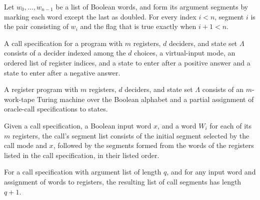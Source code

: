 \begin{lemma}
\label{Complexity.LogProg.seg_argSegs}
\leanok
{}
Let $w_0,\ldots,w_{n-1}$ be a list of Boolean words, and form its argument segments by
marking each word except the last as doubled. For every index $i<n$, segment $i$ is the
pair consisting of $w_i$ and the flag that is true exactly when $i+1<n$.
\end{lemma}

\begin{definition}
\label{Complexity.LogProg.CallSpec}
\leanok
{}
A call specification for a program with $m$ registers, $d$ deciders, and state set
$\Lambda$ consists of a decider indexed among the $d$ choices, a virtual-input mode, an
ordered list of register indices, and a state to enter after a positive answer and a
state to enter after a negative answer.
\end{definition}

\begin{definition}
\label{Complexity.LogProg.RProg}
\leanok
{}
A register program with $m$ registers, $d$ deciders, and state set $\Lambda$ consists of
an $m$-work-tape Turing machine over the Boolean alphabet and a partial assignment of
oracle-call specifications to states.
\end{definition}

\begin{definition}
\label{Complexity.LogProg.callSegs}
\leanok
{}
Given a call specification, a Boolean input word $x$, and a word $W_i$ for each of its
$m$ registers, the call’s segment list consists of the initial segment selected by the
call mode and $x$, followed by the segments formed from the words of the registers
listed in the call specification, in their listed order.
\end{definition}

\begin{lemma}
\label{Complexity.LogProg.length_callSegs}
\leanok
{}
For a call specification with argument list of length $q$, and for any input word and
assignment of words to registers, the resulting list of call segments has length $q+1$.
\end{lemma}

